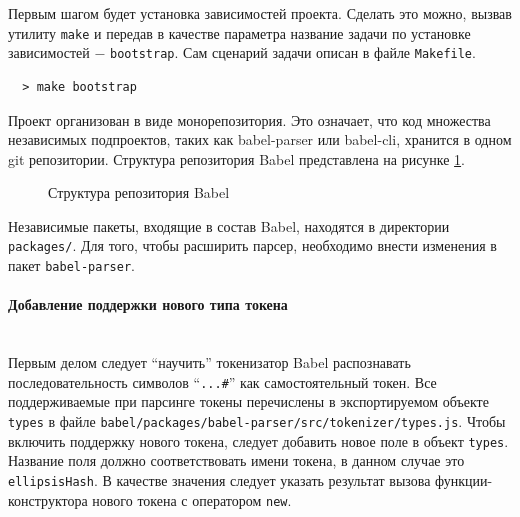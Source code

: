 \documentclass[14pt, a4paper]{article}
\def\code#1{\texttt{#1}} %
\begin{document}

Первым шагом будет установка зависимостей проекта. Сделать это можно, вызвав утилиту \code{make} и передав 
в качестве параметра название задачи по установке зависимостей $-$ \code{bootstrap}. Сам сценарий задачи 
описан в файле \code{Makefile}.

\begin{lstlisting}
  > make bootstrap
\end{lstlisting}

Проект организован в виде монорепозитория. Это означает, что код множества независимых подпроектов,
таких как babel-parser или babel-cli, хранится в одном git репозитории. Структура репозитория Babel
представлена на рисунке \ref{babel_dirs}.

\begin{figure}[H]
\centering
{}
\caption{Структура репозитория Babel}
\label{babel_dirs}
\end{figure}


Независимые пакеты, входящие в состав Babel, находятся в директории \code{packages/}. Для того, чтобы 
расширить парсер, необходимо внести изменения в пакет \code{babel-parser}.

\paragraph{Добавление поддержки нового типа токена} \mbox{}\\

Первым делом следует ``научить'' токенизатор Babel распознавать последовательность символов ``\code{...\#}'' 
как самостоятельный токен. Все поддерживаемые при парсинге токены перечислены в экспортируемом объекте 
\code{types} в файле \code{babel/packages/babel-parser/src/tokenizer/types.js}. Чтобы включить поддержку нового токена,
следует добавить новое поле в объект \code{types}. Название поля должно соответствовать имени токена, в данном случае это \code{ellipsisHash}.
В качестве значения следует указать результат вызова функции-конструктора нового токена с оператором \code{new}. 
\end{document}
